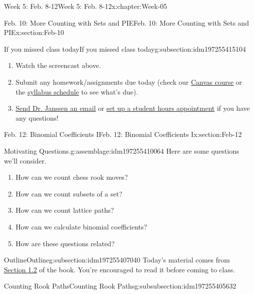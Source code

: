 \documentclass[oneside,10pt,]{book}
\numberwithin{equation}{section}
\begin{document}
\begin{chapterptx}{Week 5: Feb. 8-12}{}{Week 5: Feb. 8-12}{}{}{x:chapter:Week-05}
\begin{sectionptx}{Feb. 10: More Counting with Sets and PIE}{}{Feb. 10: More Counting with Sets and PIE}{}{}{x:section:Feb-10}
\begin{subsectionptx}{If you missed class today}{}{If you missed class today}{}{}{g:subsection:idm197255415104}
\begin{enumerate}
\item{}Watch the screencast above.%
\item{}Submit any homework\slash{}assignments due today (check our \href{https://dordt.instructure.com/courses/3110050}{Canvas course} or the \href{https://prof.mkjanssen.org/ds/index.html\#schedule}{syllabus schedule} to see what's due).%
\item{}\href{mailto:mike.janssen@dordt.edu}{Send Dr. Janssen an email} or \href{https://calendly.com/mkjanssen/student-hours}{set up a student hours appointment} if you have any questions!%
\end{enumerate}
\end{subsectionptx}
\end{sectionptx}
%
%
\typeout{************************************************}
\typeout{************************************************}
%
\begin{sectionptx}{Feb. 12: Binomial Coefficients I}{}{Feb. 12: Binomial Coefficients I}{}{}{x:section:Feb-12}
\begin{introduction}{}%
\begin{assemblage}{Motivating Questions.}{g:assemblage:idm197255410064}%
Here are some questions we'll consider. %
\begin{enumerate}
\item{}How can we count chess rook moves?%
\item{}How can we count subsets of a set?%
\item{}How can we count lattice paths?%
\item{}How can we calculate binomial coefficients?%
\item{}How are these questions related?%
\end{enumerate}
%
\end{assemblage}
\end{introduction}%
%
%
\typeout{************************************************}
\typeout{************************************************}
%
\begin{subsectionptx}{Outline}{}{Outline}{}{}{g:subsection:idm197255407040}
Today's material comes from \href{http://discrete.openmathbooks.org/dmoi3/sec_counting-binom.html}{Section 1.2} of the book. You're encouraged to read it before coming to class.%
%
%
\typeout{************************************************}
\typeout{************************************************}
%
\begin{subsubsectionptx}{Counting Rook Paths}{}{Counting Rook Paths}{}{}{g:subsubsection:idm197255405632}

\end{subsubsectionptx}
\end{subsectionptx}
\end{sectionptx}
\end{chapterptx}
\end{document}
